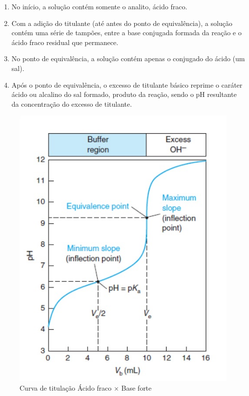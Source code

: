\begin{enumerate}
    \item No início, a solução contém somente o analito, ácido fraco.
    \item Com a adição do titulante (até antes do ponto de equivalência), a solução contém uma série
        de tampões, entre a base conjugada formada da reação e o ácido fraco residual que permanece.
    \item No ponto de equivalência, a solução contém apenas o conjugado do ácido (um sal).
    \item Após o ponto de equivalência, o excesso de titulante básico reprime o caráter ácido ou
        alcalino do sal formado, produto da reação, sendo o pH resultante da concentração do excesso
        de titulante.
\end{enumerate}

\begin{figure}[H]
\begin{center}
    \includegraphics[scale=.9]{figuras/titulacao.jpg}
\end{center}
\caption{Curva de titulação Ácido fraco $\times$ Base forte}
\label{fig:curva_titulacao}
\end{figure}

